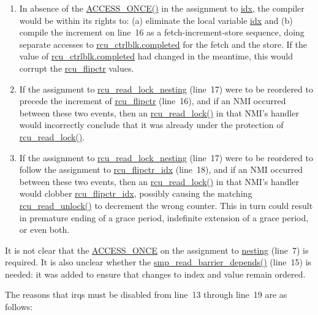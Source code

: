 \begin{enumerate}
\item	In absence of the \url{ACCESS_ONCE()} in the assignment
	to \url{idx}, the compiler would be within its rights
	to: (a) eliminate the local variable \url{idx} and
	(b) compile the increment on line~16 as a
	fetch-increment-store sequence, doing separate accesses to
	\url{rcu_ctrlblk.completed} for the fetch and the
	store.
	If the value of \url{rcu_ctrlblk.completed} had
	changed in the meantime, this would corrupt the
	\url{rcu_flipctr} values.
\item	If the assignment to \url{rcu_read_lock_nesting}
	(line~17) were to be reordered to precede the increment
	of \url{rcu_flipctr} (line~16), and if an
	NMI occurred between these two events, then an
	\url{rcu_read_lock()} in that NMI's handler
	would incorrectly conclude that it was already under the
	protection of \url{rcu_read_lock()}.
\item	If the assignment to \url{rcu_read_lock_nesting}
        (line~17) were to be reordered to follow the assignment
	to \url{rcu_flipctr_idx} (line~18), and if an
	NMI occurred between these two events, then an
	\url{rcu_read_lock()} in that NMI's handler
	would clobber \url{rcu_flipctr_idx}, possibly
	causing the matching \url{rcu_read_unlock()} to
	decrement the wrong counter.
	This in turn could result in premature ending of a
	grace period, indefinite extension of a grace period,
	or even both.
\end{enumerate}

It is not clear that the \url{ACCESS_ONCE} on the assignment to
\url{nesting} (line~7) is required.
It is also unclear whether the \url{smp_read_barrier_depends()}
(line~15) is needed: it was added to ensure that changes to index
and value remain ordered.

The reasons that irqs must be disabled from line~13 through
line~19 are as follows:

